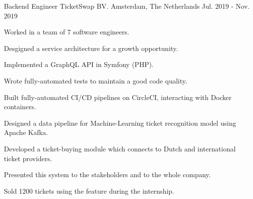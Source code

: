 

\begin{cventries}

  \cventry
    {Backend Engineer} %
    {TicketSwap BV.} %
    {Amsterdam, The Netherlands} %
    {Jul. 2019 - Nov. 2019} %
    {
      \begin{cvitems} %
        \item {Worked in a team of 7 software engineers.}
        \item {Desgigned a service architecture for a growth opportunity.}
        \item {Implemented a GraphQL API in Symfony (PHP).}
        \item {Wrote fully-automated tests to maintain a good code quality.}
        \item {Built fully-automated CI/CD pipelines on CircleCI, interacting with Docker containers.}
        \item {Designed a data pipeline for Machine-Learning ticket recognition model using Apache Kafka.}
        \item {Developed a ticket-buying module which connects to Dutch and international ticket providers.}
        \item {Presented this system to the stakeholders and to the whole company.}
        \item {Sold 1200 tickets using the feature during the internship.}
      \end{cvitems}
    }

\end{cventries}
